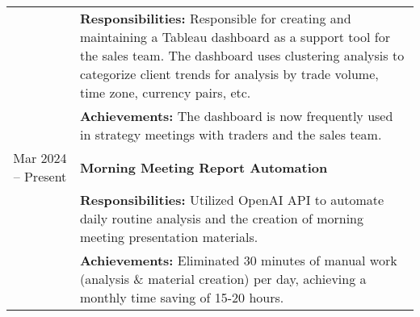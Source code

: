\documentclass[uplatex,a4j,10.5pt,dvipdfmx]{jsarticle}
\begin{document}
\begin{longtable}{|c|p{14cm}|}
	                                      & {\small \textbf{Responsibilities:}} Responsible for creating and maintaining a Tableau dashboard as a support tool for the sales team. The dashboard uses clustering analysis to categorize client trends for analysis by trade volume, time zone, currency pairs, etc. \\
	                                      & {\small \textbf{Achievements:}} The dashboard is now frequently used in strategy meetings with traders and the sales team.                                                                                                                                              \\
	\hline
	Mar 2024 -- Present                   & \textbf{\textbullet{} Morning Meeting Report Automation}                                                                                                                                                                                                                \\
	                                      & {\small \textbf{Responsibilities:}} Utilized OpenAI API to automate daily routine analysis and the creation of morning meeting presentation materials.                                                                                                                  \\
	                                      & {\small \textbf{Achievements:}} Eliminated 30 minutes of manual work (analysis \& material creation) per day, achieving a monthly time saving of 15-20 hours.                                                                                                           \\
	\hline
\end{longtable}
\end{document}
